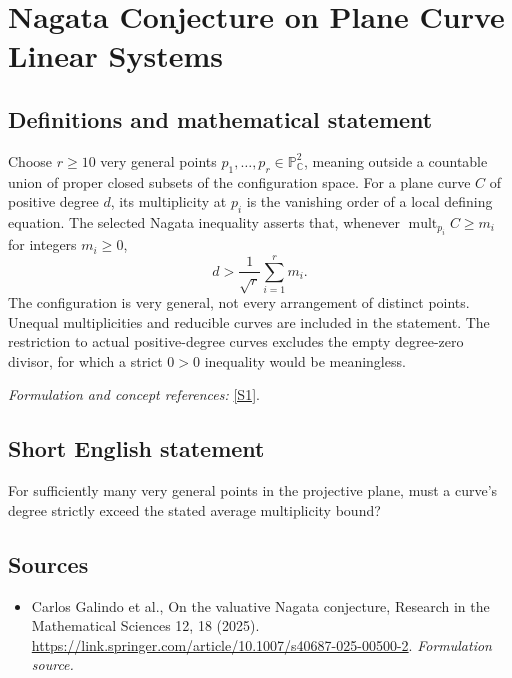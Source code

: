 \documentclass[11pt]{article}
\begin{document}
\section*{\texorpdfstring{Nagata Conjecture on Plane Curve Linear Systems}{Nagata Conjecture on Plane Curve Linear Systems}}\label{365}
\subsection{Definitions and mathematical statement}
Choose $r\ge10$ very general points $p_1,\ldots,p_r\in{\mathbb{P}}^2_{{\mathbb{C}}}$, meaning outside a countable union of proper closed subsets of the configuration space. For a plane curve $C$ of positive degree $d$, its multiplicity at $p_i$ is the vanishing order of a local defining equation. The selected Nagata inequality asserts that, whenever $\operatorname{mult}_{p_i}C\ge m_i$ for integers $m_i\ge0$,
\[
 d>\frac1{\sqrt r}\sum_{i=1}^r m_i.
\]
The configuration is very general, not every arrangement of distinct points. Unequal multiplicities and reducible curves are included in the statement. The restriction to actual positive-degree curves excludes the empty degree-zero divisor, for which a strict $0>0$ inequality would be meaningless.
\par\smallskip\textit{Formulation and concept references:} \href{https://link.springer.com/article/10.1007/s40687-025-00500-2}{[S1]}.

\subsection{Short English statement}
For sufficiently many very general points in the projective plane, must a curve's degree strictly exceed the stated average multiplicity bound?
\subsection{Sources}
\begin{itemize}
\item[S1]Carlos Galindo et al., On the valuative Nagata conjecture, Research in the Mathematical Sciences 12, 18 (2025).
\url{https://link.springer.com/article/10.1007/s40687-025-00500-2}.
\textit{Formulation source.}
\end{itemize}
\end{document}
